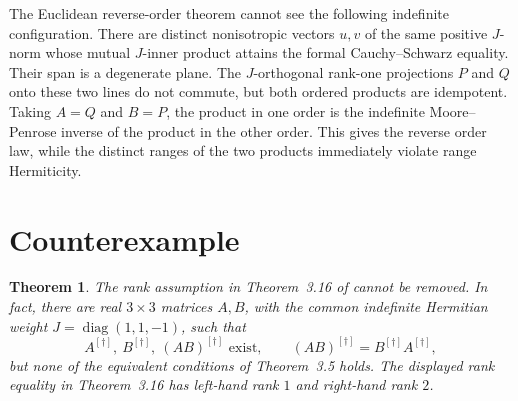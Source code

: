 \documentclass[11pt]{article}
\newtheorem{theorem}{Theorem}
\newcommand{\jmp}{^{[\dagger]}}
\begin{document}
The Euclidean reverse-order theorem cannot see the following indefinite
configuration.  There are distinct nonisotropic vectors \(u,v\) of the same
positive \(J\)-norm whose mutual \(J\)-inner product attains the formal
Cauchy--Schwarz equality.  Their span is a degenerate plane.  The
\(J\)-orthogonal rank-one projections \(P\) and \(Q\) onto these two lines do
not commute, but both ordered products are idempotent.  Taking \(A=Q\) and
\(B=P\), the product in one order is the indefinite Moore--Penrose inverse of
the product in the other order.  This gives the reverse order law, while the
distinct ranges of the two products immediately violate range Hermiticity.

\section{Counterexample}

\begin{theorem}
The rank assumption in Theorem~3.16 of \cite{KJS} cannot be removed.  In
fact, there are real \(3\times3\) matrices \(A,B\), with the common
indefinite Hermitian weight \(J=\operatorname{diag}(1,1,-1)\), such that
\[
 A\jmp,\ B\jmp,\ (AB)\jmp\text{ exist},\qquad
 (AB)\jmp=B\jmp A\jmp,
\]
but none of the equivalent conditions of Theorem~3.5 holds.  The displayed
rank equality in Theorem~3.16 has left-hand rank \(1\) and right-hand rank
\(2\).
\end{theorem}
\end{document}
